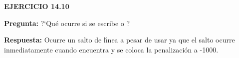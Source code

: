 \centerline{\bf EJERCICIO 14.10}

\bigskip

{\bf Pregunta:} ?`Qu\'e ocurre si se escribe {\tt \string\nobreak\string\break\relax}
o {\tt \string\break\string\nobreak\relax} ?

{\bf Respuesta:} Ocurre un salto de l\'{\i}nea a pesar de usar {\tt \string\nobreak} ya que
el salto ocurre inmediatamente cuando encuentra {\tt \string\break} y se coloca la penalizaci\'on
a -1000.
\bye